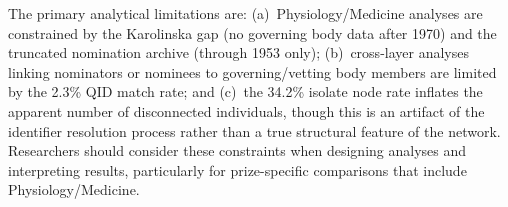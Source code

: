 The primary analytical limitations are: (a)~Physiology/Medicine analyses
are constrained by the Karolinska gap (no governing body data after 1970)
and the truncated nomination archive (through 1953 only); (b)~cross-layer
analyses linking nominators or nominees to governing/vetting body members
are limited by the 2.3\% QID match rate; and (c)~the 34.2\% isolate node
rate inflates the apparent number of disconnected individuals, though this
is an artifact of the identifier resolution process rather than a true
structural feature of the network. Researchers should consider these
constraints when designing analyses and interpreting results, particularly
for prize-specific comparisons that include Physiology/Medicine.
